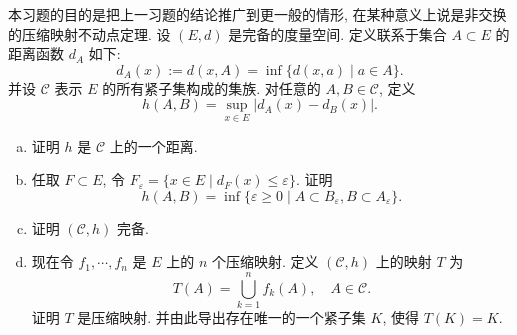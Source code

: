 \begin{exercise}
    本习题的目的是把上一习题的结论推广到更一般的情形, 在某种意义上说是非交换
    的压缩映射不动点定理. 设 $(E,d)$ 是完备的度量空间.
    定义联系于集合 $A\subset E$ 的距离函数 $d_A$ 如下:
    \[d_A(x):=d(x,A)=\inf\{d(x,a)\mid a\in A\}.\]
    并设 $\mathcal{C}$ 表示 $E$ 的所有紧子集构成的集族.
    对任意的 $A,B\in\mathcal{C}$, 定义
    \[h(A,B)=\sup_{x\in E}|d_A(x)-d_B(x)|.\]
    \begin{enumerate}[(a)]
        \item 证明 $h$ 是 $\mathcal{C}$ 上的一个距离.
        \item 任取 $F\subset E$, 令 $F_{\varepsilon}=\{x\in E\mid d_F(x)\leq\varepsilon\}$. 证明
              \[h(A,B)=\inf\{\varepsilon\geq 0\mid A\subset B_{\varepsilon}, B\subset A_{\varepsilon}\}.\]
        \item 证明 $(\mathcal{C},h)$ 完备.
        \item 现在令 $f_1,\cdots,f_n$ 是 $E$ 上的 $n$ 个压缩映射.
              定义 $(\mathcal{C},h)$ 上的映射 $T$ 为
              \[T(A)=\bigcup_{k=1}^n f_k(A),\quad A\in\mathcal{C}.\]
              证明 $T$ 是压缩映射. 并由此导出存在唯一的一个紧子集 $K$,
              使得 $T(K)=K$.
    \end{enumerate}
\end{exercise}

